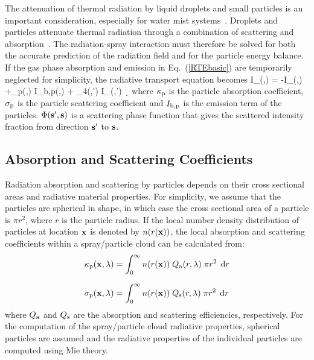 The attenuation of thermal radiation by liquid droplets and small particles is an important consideration, especially for water mist systems~\cite{Ravigururajan:1}.  Droplets and particles attenuate thermal radiation through a combination of scattering and absorption~\cite{Tuntomo:1}.  The radiation-spray interaction must therefore be solved for both the accurate prediction of the radiation field and for the particle energy balance. If the gas phase absorption and emission in Eq.~(\ref{RTEbasic}) are temporarily neglected for simplicity, the radiative transport equation becomes
\be
\bs \cdot \nabla I_{\la}(\bx,\bs) = -
I_{\la}(\bx,\bs) +\kappa_{\rm p}(\bx,\la) \; I_{{\rm b,p}}(\bx,\la) +
\int_{4\pi}\Phi(\bs,\bs') \; I_{\la}(\bx,\bs') \, \d\Omega
\label{RTEspray}
\ee
where $\kappa_{\rm p}$ is the particle absorption coefficient, $\sigma_{\rm p}$ is the particle scattering coefficient and $I_{{\rm b,p}}$ is the emission term of the particles. $\Phi({\mathbf{s}}',{\mathbf{s}})$ is a scattering phase function that gives the scattered intensity fraction from direction ${\mathbf{s}}'$ to ${\mathbf{s}}$.

\subsection{Absorption and Scattering Coefficients}

Radiation absorption and scattering by particles depends on their cross sectional areas and radiative material properties. For simplicity, we assume that the particles are spherical in shape, in which case the cross sectional area of a particle is $\pi r^2$, where $r$ is the particle radius. If the local number density distribution of particles at location ${\mathbf{x}}$ is denoted by $n(r({\mathbf{x}}))$, the local absorption and scattering coefficients within a spray/particle cloud can be calculated from:
\begin{align}
\kappa_{\rm p}(\bx,\la) &= \int_0^\infty n(r(\bx)) \; Q_{\rm a}(r,\la) \; \pi r^2 \; \d r \\[0.1in] %
\sigma_{\rm p}(\bx,\la) &= \int_0^\infty n(r(\bx)) \; Q_{\rm s}(r,\la) \; \pi r^2 \; \d r           %
\end{align}
where $Q_{\rm a}$ and $Q_{\rm s}$ are the absorption and scattering efficiencies, respectively. For the computation of the spray/particle cloud radiative properties, spherical particles are assumed and the radiative properties of the individual particles are computed using Mie theory.

